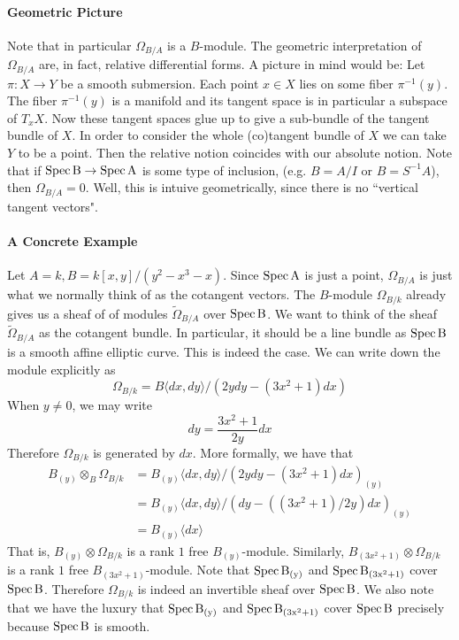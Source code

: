 \documentclass[12pt]{article}
\theoremstyle{plain}
\theoremstyle{definition}
\newcommand{\Spec}{\rm Spec\,}
\newcommand\tensor{{\otimes}}
\newcommand{\<}{\langle}
\renewcommand{\>}{\rangle}
\def\wt{\widetilde}
\newcommand{\Ohm}{\Omega}
\begin{document}
\paragraph{Geometric Picture} 
Note that in particular $\Ohm_{B/A}$ is a $B$-module. The geometric interpretation of $\Ohm_{B/A}$ are, in fact, relative differential forms. A picture in mind would be: Let $\pi : X \to Y$ be a smooth submersion. Each point $x \in X$ lies on some fiber $\pi^{-1}(y)$. The fiber $\pi^{-1}(y)$ is a manifold and its tangent space is in particular a subspace of $T_x X$. Now these tangent spaces glue up to give a sub-bundle of the tangent bundle of $X$. In order to consider the whole (co)tangent bundle of $X$ we can take $Y$ to be a point. Then the relative notion coincides with our absolute notion. Note that if $\Spec B \to \Spec A$ is some type of inclusion, (e.g. $B = A/I$ or $B = S^{-1} A$), then $\Ohm_{B/A} = 0$. Well, this is intuive geometrically, since there is no ``vertical tangent vectors".  


\paragraph{A Concrete Example} Let $A = k, B = k[x, y]/(y^2 - x^3 - x)$. Since $\Spec A$ is just a point, $\Ohm_{B/A}$ is just what we normally think of as the cotangent vectors. The $B$-module $\Ohm_{B/k}$ already gives us a sheaf of of modules $\wt{\Ohm}_{B/A}$ over $\Spec B$. We want to think of the sheaf $\wt{\Ohm}_{B/A}$ as the cotangent bundle. In particular, it should be a line bundle as $\Spec B$ is a smooth affine elliptic curve. This is indeed the case. We can write down the module explicitly as
$$ \Ohm_{B/k} = B\< dx, dy \>/( 2y dy - (3 x^2 + 1)dx) $$
When $y \neq 0$, we may write 
$$ dy = \frac{3 x^2 + 1}{2y} dx$$
Therefore $\Ohm_{B/k}$ is generated by $dx$. More formally, we have that
\begin{align*} B_{(y)} \tensor_B \Ohm_{B/k} &= B_{(y)} \< dx, dy \>/( 2y dy - (3 x^2 + 1)dx)_{(y)} \\
&= B_{(y)} \< dx, dy \>/( dy - ((3 x^2 + 1)/2y)dx)_{(y)} \\
&= B_{(y)} \< dx \>
\end{align*}
That is, $B_{(y)} \tensor \Ohm_{B/k}$ is a rank $1$ free $B_{(y)}$-module. Similarly, $B_{(3x^2 + 1)} \tensor \Ohm_{B/k}$ is a rank $1$ free $B_{(3x^2 + 1)}$-module. Note that $\Spec B_{(y)}$ and $\Spec B_{(3x^2 + 1)}$ cover $\Spec B$. Therefore $\Ohm_{B/k}$ is indeed an invertible sheaf over $\Spec B$. We also note that we have the luxury that $\Spec B_{(y)}$ and $\Spec B_{(3x^2 + 1)}$ cover $\Spec B$ precisely because $\Spec B$ is smooth. 
\end{document}
